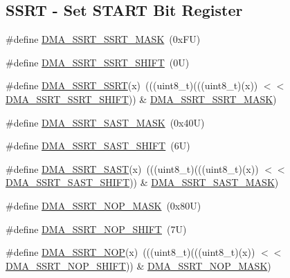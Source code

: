 \subsection*{S\+S\+RT -\/ Set S\+T\+A\+RT Bit Register}
\begin{DoxyCompactItemize}
\item 
\#define \mbox{\hyperlink{group___d_m_a___register___masks_gad3b3959cb4d1e1db5bbb4cc6291a0390}{D\+M\+A\+\_\+\+S\+S\+R\+T\+\_\+\+S\+S\+R\+T\+\_\+\+M\+A\+SK}}~(0x\+F\+U)
\item 
\#define \mbox{\hyperlink{group___d_m_a___register___masks_gacdadd55124a59d83a6b26976e85fb0ff}{D\+M\+A\+\_\+\+S\+S\+R\+T\+\_\+\+S\+S\+R\+T\+\_\+\+S\+H\+I\+FT}}~(0\+U)
\item 
\#define \mbox{\hyperlink{group___d_m_a___register___masks_ga381ae16ec1d637479a855f345d3e160f}{D\+M\+A\+\_\+\+S\+S\+R\+T\+\_\+\+S\+S\+RT}}(x)~(((uint8\+\_\+t)(((uint8\+\_\+t)(x)) $<$$<$ \mbox{\hyperlink{group___d_m_a___register___masks_gacdadd55124a59d83a6b26976e85fb0ff}{D\+M\+A\+\_\+\+S\+S\+R\+T\+\_\+\+S\+S\+R\+T\+\_\+\+S\+H\+I\+FT}})) \& \mbox{\hyperlink{group___d_m_a___register___masks_gad3b3959cb4d1e1db5bbb4cc6291a0390}{D\+M\+A\+\_\+\+S\+S\+R\+T\+\_\+\+S\+S\+R\+T\+\_\+\+M\+A\+SK}})
\item 
\#define \mbox{\hyperlink{group___d_m_a___register___masks_gadcecaad6474bd238180952527a63130b}{D\+M\+A\+\_\+\+S\+S\+R\+T\+\_\+\+S\+A\+S\+T\+\_\+\+M\+A\+SK}}~(0x40\+U)
\item 
\#define \mbox{\hyperlink{group___d_m_a___register___masks_gac7f4ffa288a04ba1361b240caf7188d7}{D\+M\+A\+\_\+\+S\+S\+R\+T\+\_\+\+S\+A\+S\+T\+\_\+\+S\+H\+I\+FT}}~(6\+U)
\item 
\#define \mbox{\hyperlink{group___d_m_a___register___masks_gafbd701ff1cc8f6b92855ab4b4bdf3358}{D\+M\+A\+\_\+\+S\+S\+R\+T\+\_\+\+S\+A\+ST}}(x)~(((uint8\+\_\+t)(((uint8\+\_\+t)(x)) $<$$<$ \mbox{\hyperlink{group___d_m_a___register___masks_gac7f4ffa288a04ba1361b240caf7188d7}{D\+M\+A\+\_\+\+S\+S\+R\+T\+\_\+\+S\+A\+S\+T\+\_\+\+S\+H\+I\+FT}})) \& \mbox{\hyperlink{group___d_m_a___register___masks_gadcecaad6474bd238180952527a63130b}{D\+M\+A\+\_\+\+S\+S\+R\+T\+\_\+\+S\+A\+S\+T\+\_\+\+M\+A\+SK}})
\item 
\#define \mbox{\hyperlink{group___d_m_a___register___masks_gad515a6cb794fc947138fac918dedd068}{D\+M\+A\+\_\+\+S\+S\+R\+T\+\_\+\+N\+O\+P\+\_\+\+M\+A\+SK}}~(0x80\+U)
\item 
\#define \mbox{\hyperlink{group___d_m_a___register___masks_ga0c698d2dc363fc0487cccc5dfbd4fed5}{D\+M\+A\+\_\+\+S\+S\+R\+T\+\_\+\+N\+O\+P\+\_\+\+S\+H\+I\+FT}}~(7\+U)
\item 
\#define \mbox{\hyperlink{group___d_m_a___register___masks_gab8d402c58eceb0d66d7cc42a63655756}{D\+M\+A\+\_\+\+S\+S\+R\+T\+\_\+\+N\+OP}}(x)~(((uint8\+\_\+t)(((uint8\+\_\+t)(x)) $<$$<$ \mbox{\hyperlink{group___d_m_a___register___masks_ga0c698d2dc363fc0487cccc5dfbd4fed5}{D\+M\+A\+\_\+\+S\+S\+R\+T\+\_\+\+N\+O\+P\+\_\+\+S\+H\+I\+FT}})) \& \mbox{\hyperlink{group___d_m_a___register___masks_gad515a6cb794fc947138fac918dedd068}{D\+M\+A\+\_\+\+S\+S\+R\+T\+\_\+\+N\+O\+P\+\_\+\+M\+A\+SK}})
\end{DoxyCompactItemize}
